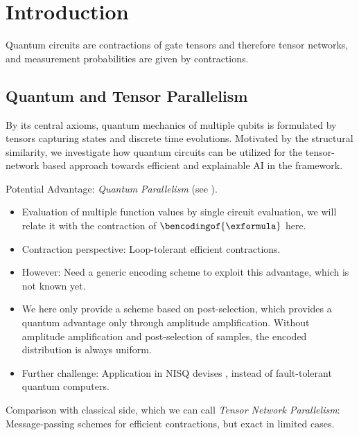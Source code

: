 \section{Introduction}

Quantum circuits are contractions of gate tensors and therefore tensor networks, and measurement probabilities are given by contractions.

\subsection{Quantum and Tensor Parallelism}

By its central axioms, quantum mechanics of multiple qubits is formulated by tensors capturing states and discrete time evolutions.
Motivated by the structural similarity, we investigate how quantum circuits can be utilized for the tensor-network based approach towards efficient and explainable AI in the \tnreason{} framework.

Potential Advantage: \emph{Quantum Parallelism} (see \cite[Section 3.2.5]{schuld_machine_2021}).
\begin{itemize}
    \item Evaluation of multiple function values by single circuit evaluation, we will relate it with the contraction of $\bencodingof{\exformula}$ here.
    \item Contraction perspective: Loop-tolerant efficient contractions.
    \item However: Need a generic encoding scheme to exploit this advantage, which is not known yet.
    \item We here only provide a scheme based on post-selection, which provides a quantum advantage only through amplitude amplification.
    Without amplitude amplification and post-selection of samples, the encoded distribution is always uniform.
    \item Further challenge: Application in NISQ devises \cite{preskill_quantum_2018}, instead of fault-tolerant quantum computers.
\end{itemize}
Comparison with classical side, which we can call \emph{Tensor Network Parallelism}:
Message-passing schemes for efficient contractions, but exact in limited cases.


